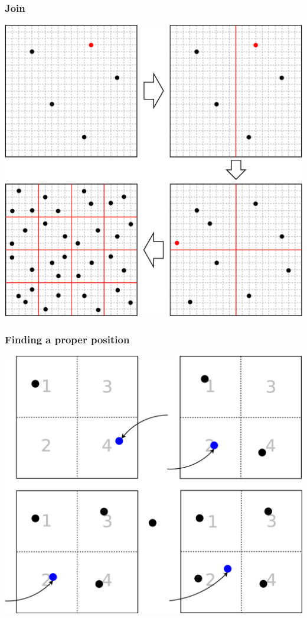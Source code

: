 \documentclass[red]{beamer}
\begin{document}
\begin{frame}
\frametitle{Join}
\begin{center}
\includegraphics[scale=0.15]{figs/ed2_join.eps}
\end{center}
\end{frame}

\begin{frame}
\frametitle{Finding a proper position}
\begin{center}
\includegraphics[scale=0.15]{figs/position.eps}
\end{center}
\end{frame}
\end{document}
